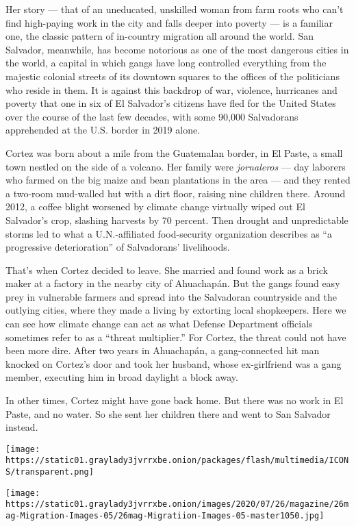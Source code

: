 Her story --- that of an uneducated, unskilled woman from farm roots who
can't find high-paying work in the city and falls deeper into poverty
--- is a familiar one, the classic pattern of in-country migration all
around the world. San Salvador, meanwhile, has become notorious as one
of the most dangerous cities in the world, a capital in which gangs have
long controlled everything from the majestic colonial streets of its
downtown squares to the offices of the politicians who reside in them.
It is against this backdrop of war, violence, hurricanes and poverty
that one in six of El Salvador's citizens have fled for the United
States over the course of the last few decades, with some 90,000
Salvadorans apprehended at the U.S. border in 2019 alone.

Cortez was born about a mile from the Guatemalan border, in El Paste, a
small town nestled on the side of a volcano. Her family were
\emph{jornaleros} --- day laborers who farmed on the big maize and bean
plantations in the area --- and they rented a two-room mud-walled hut
with a dirt floor, raising nine children there. Around 2012, a coffee
blight worsened by climate change virtually wiped out El Salvador's
crop, slashing harvests by 70 percent. Then drought and unpredictable
storms led to what a U.N.-affiliated food-security organization
describes as ``a progressive deterioration'' of Salvadorans'
livelihoods.

That's when Cortez decided to leave. She married and found work as a
brick maker at a factory in the nearby city of Ahuachapán. But the gangs
found easy prey in vulnerable farmers and spread into the Salvadoran
countryside and the outlying cities, where they made a living by
extorting local shopkeepers. Here we can see how climate change can act
as what Defense Department officials sometimes refer to as a ``threat
multiplier.'' For Cortez, the threat could not have been more dire.
After two years in Ahuachapán, a gang-connected hit man knocked on
Cortez's door and took her husband, whose ex-girlfriend was a gang
member, executing him in broad daylight a block away.

In other times, Cortez might have gone back home. But there was no work
in El Paste, and no water. So she sent her children there and went to
San Salvador instead.

\texttt{[image: https://static01.graylady3jvrrxbe.onion/packages/flash/multimedia/ICONS/transparent.png]}

\texttt{[image: https://static01.graylady3jvrrxbe.onion/images/2020/07/26/magazine/26mag-Migration-Images-05/26mag-Migratiion-Images-05-master1050.jpg]}

